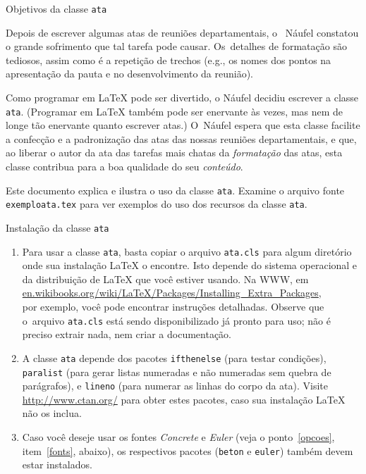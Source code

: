 \documentclass[12pt,a4paper,euler,beton]{ata}
\begin{document}
\begin{ponto}{Objetivos da classe \texttt{ata}}

  Depois de escrever algumas atas de reuniões departamentais, o~\prof
  Náufel constatou o grande sofrimento que tal tarefa pode causar.
  Os~detalhes de formatação são tediosos, assim como é a repetição de
  trechos (e.g., os nomes dos pontos na apresentação da pauta e no
  desenvolvimento da reunião).

  Como programar em \LaTeX{} pode ser divertido, o \prof Náufel
  decidiu escrever a classe \texttt{ata}. (Programar em \LaTeX{}
  também pode ser enervante às vezes, mas nem de longe tão enervante
  quanto escrever atas.) O~\prof Náufel espera que esta classe
  facilite a confecção e a padronização das atas das nossas reuniões
  departamentais, e que, ao liberar o autor da ata das tarefas mais
  chatas da \emph{formatação} das atas, esta classe contribua para a
  boa qualidade do seu \emph{conteúdo}.

  Este documento explica e ilustra o uso da classe \texttt{ata}.
  Examine o arquivo fonte \texttt{exemploata.tex} para ver exemplos do
  uso dos recursos da classe \texttt{ata}.

\end{ponto}


\begin{ponto}[inst]{Instalação da classe \texttt{ata}}
  
  \begin{enumerate}

  \item Para usar a classe \texttt{ata}, basta copiar o arquivo
    \texttt{ata.cls} para algum diretório onde sua instalação \LaTeX{}
    o encontre. Isto depende do sistema operacional e da distribuição
    de \LaTeX{} que você estiver usando. Na WWW, em
    \url{en.wikibooks.org/wiki/LaTeX/Packages/Installing_Extra_Packages},\\
    por exemplo, você pode encontrar instruções detalhadas. Observe
    que o~arquivo \texttt{ata.cls} está sendo disponibilizado já
    pronto para uso; não é preciso extrair nada, nem criar a
    documentação.

  \item A classe \texttt{ata} depende dos pacotes \texttt{ifthenelse}
    (para testar condições), \texttt{paralist} (para gerar listas
    numeradas e não numeradas sem quebra de parágrafos), e
    \texttt{lineno} (para numerar as linhas do corpo da ata). Visite
    \url{http://www.ctan.org/} para obter estes pacotes, caso sua
    instalação \LaTeX{} não os inclua.

  \item Caso você deseje usar os fontes \emph{Concrete} e \emph{Euler}
    (veja o ponto~\ref{opcoes}, item~\ref{fonts}, abaixo), os
    respectivos pacotes (\texttt{beton} e \texttt{euler}) também devem
    estar instalados.

  \end{enumerate}
  
\end{ponto}
\end{document}

